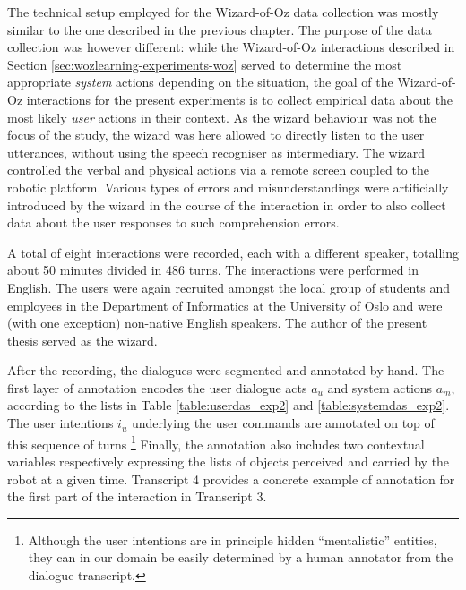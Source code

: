 The technical setup employed for the Wizard-of-Oz data collection was mostly similar to the one described in the previous chapter. The purpose of the data collection was however different: while the Wizard-of-Oz interactions described in Section \ref{sec:wozlearning-experiments-woz} served to determine the most appropriate \textit{system} actions depending on the situation, the goal of the Wizard-of-Oz interactions for the present experiments is to collect empirical data about the most likely \textit{user} actions in their context.  As the wizard behaviour was not the focus of the study, the wizard was here allowed to directly listen to the user utterances, without using the speech recogniser as intermediary. The wizard controlled the verbal and physical actions via a remote screen coupled to the robotic platform. Various types of errors and misunderstandings were artificially introduced by the wizard in the course of the interaction in order to also collect data about the user responses to such comprehension errors. 

A total of eight interactions were recorded, each with a different speaker, totalling about 50 minutes divided in 486 turns.  The interactions were performed in English. The users were again recruited amongst the local group of students and employees in the Department of Informatics at the University of Oslo and were (with one exception) non-native English speakers. The author of the present thesis served as the wizard. 

After the recording, the dialogues were segmented and annotated by hand. The first layer of annotation encodes the user dialogue acts $a_u$ and system actions $a_m$, according to the lists in Table \ref{table:userdas_exp2} and \ref{table:systemdas_exp2}. The user intentions $i_u$ underlying the user commands are annotated on top of this sequence of turns \footnote{Although the user intentions are in principle hidden ``mentalistic'' entities, they can in our domain be easily determined by a human annotator from the dialogue transcript.} Finally, the annotation also includes two contextual variables respectively expressing the lists of objects perceived and carried by the robot at a given time. Transcript 4 provides a concrete example of annotation for the first part of the interaction in Transcript 3. 

